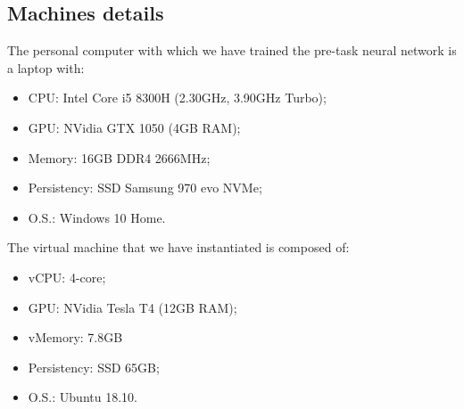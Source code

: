 \subsection{Machines details}\label{ss:machines}
The personal computer with which we have trained the pre-task neural network is a laptop with:
\begin{itemize}
    \item CPU: Intel Core i5 8300H (2.30GHz, 3.90GHz Turbo);
    \item GPU: NVidia GTX 1050 (4GB RAM);
    \item Memory: 16GB DDR4 2666MHz;
    \item Persistency: SSD Samsung 970 evo NVMe;
    \item O.S.: Windows 10 Home.
\end{itemize}
The virtual machine that we have instantiated is composed of:
\begin{itemize}
    \item vCPU: 4-core;
    \item GPU: NVidia Tesla T4 (12GB RAM);
    \item vMemory: 7.8GB
    \item Persistency: SSD 65GB;
    \item O.S.: Ubuntu 18.10.
\end{itemize}



